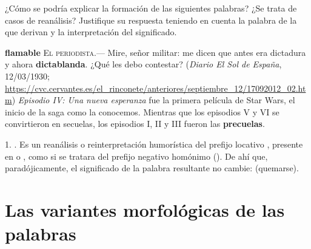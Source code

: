 \begin{ejercicio}\label{ej:04-reanalisis}
¿Cómo se podría explicar la formación de las siguientes palabras? ¿Se trata de
casos de reanálisis? Justifique su respuesta teniendo en cuenta la palabra de la
que derivan y la interpretación del significado.

\begin{exe}
  \ex \textbf{flamable}
  \ex \textsc{El periodista}.--- Mire, señor militar: me dicen que antes era
      dictadura y ahora \textbf{dictablanda}. ¿Qué les debo contestar?
      (\textit{Diario El Sol de España}, 12/03/1930;
      \url{https://cvc.cervantes.es/el_rinconete/anteriores/septiembre_12/17092012_02.htm})
  \ex {[\ldots]} \textit{Episodio IV: Una nueva esperanza} fue la primera
      película de Star Wars, el inicio de la saga como la conocemos. Mientras
      que los episodios V y VI se convirtieron en secuelas, los episodios I, II
      y III fueron las \textbf{precuelas}.
\end{exe}

\begin{resuelto}
1. . Es un reanálisis o reinterpretación humorística del prefijo
locativo , presente en  o , como si
se tratara del prefijo negativo homónimo (). De ahí
que, paradójicamente, el significado de la palabra resultante no cambie:
 (quemarse).
\end{resuelto}
\end{ejercicio}

\section{Las variantes morfológicas de las palabras}\label{sec:04-variantes}

